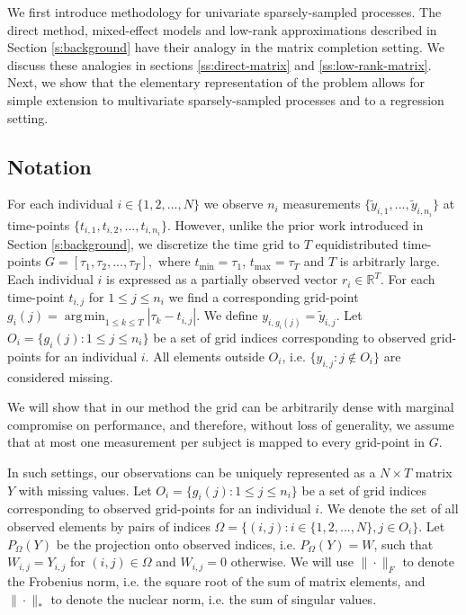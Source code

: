 \documentclass[preprint]{imsart}
\numberwithin{equation}{section}
\theoremstyle{plain}
\newcommand{\R}{\mathbb{R}}
\DeclareMathOperator*{\argmin}{arg\,min}
\begin{document}
We first introduce methodology for univariate sparsely-sampled processes. The direct method, mixed-effect models and low-rank approximations described in Section \ref{s:background} have their analogy in the matrix completion setting. We discuss these analogies in sections \ref{ss:direct-matrix} and \ref{ss:low-rank-matrix}. Next, we show that the elementary representation of the problem allows for simple extension to multivariate sparsely-sampled processes and to a regression setting.

\subsection{Notation}

For each individual $i \in \{1,2,...,N\}$ we observe $n_i$ measurements $\{\tilde y_{i,1},...,\tilde y_{i,n_i}\}$ at time-points $\{t_{i,1},t_{i,2},...,t_{i,n_i}\}$. However, unlike the prior work introduced in Section \ref{s:background}, we discretize the time grid to $T$ equidistributed time-points $G = \left[\tau_1, \tau_2, ..., \tau_T\right],$ where $t_{\min} = \tau_1$, $t_{\max} = \tau_T$ and $T$ is arbitrarly large. Each individual $i$ is expressed as a partially observed vector $r_i \in \R^T$. For each time-point $t_{i,j}$ for $1 \leq j \leq n_i$ we find a corresponding grid-point $g_i(j) = \argmin_{1 \leq k \leq T}  |\tau_k - t_{i,j}|$. We define $y_{i,g_i(j)} = \tilde y_{i,j}$. Let $O_i = \{g_i(j): 1 \leq j \leq n_i \}$ be a set of grid indices corresponding to observed grid-points for an individual $i$. All elements outside $O_i$, i.e. $\{y_{i,j} : j \notin O_i\}$ are considered missing.

We will show that in our method the grid can be arbitrarily dense with marginal compromise on performance, and therefore, without loss of generality, we assume that at most one measurement per subject is mapped to every grid-point in $G$.

In such settings, our observations can be uniquely represented as a $N \times T$ matrix $Y$ with missing values. Let $O_i = \{g_i(j): 1 \leq j \leq n_i \}$ be a set of grid indices corresponding to observed grid-points for an individual $i$. We denote the set of all observed elements by pairs of indices $\Omega = \{ (i,j) : i\in \{1,2,...,N\}, j \in O_i \}$. Let $P_\Omega(Y)$ be the projection onto observed indices, i.e. $P_\Omega(Y) = W$, such that $W_{i,j} = Y_{i,j}$ for $(i,j) \in \Omega$ and $W_{i,j} = 0$ otherwise. We will use $\|\cdot\|_F$ to denote the Frobenius norm, i.e. the square root of the sum of matrix elements, and $\|\cdot\|_*$ to denote the nuclear norm, i.e. the sum of singular values.
\end{document}
